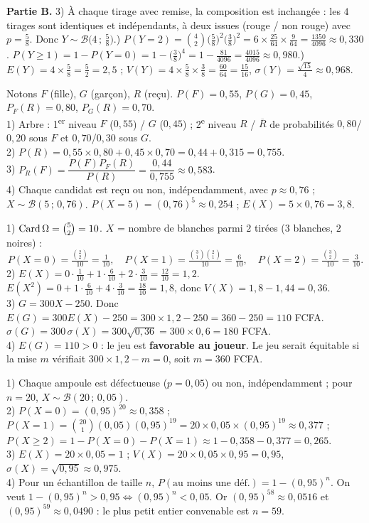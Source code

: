 \textbf{Partie B.} 3) À chaque tirage avec remise, la composition est inchangée :
les $4$ tirages sont identiques et indépendants, à deux issues (rouge / non
rouge) avec $p=\frac58$. Donc $Y\sim\mathcal B\big(4\,;\,\frac58\big)$.) $P(Y{=}2)=\binom42\Big(\frac58\Big)^2\Big(\frac38\Big)^2
=6\times\frac{25}{64}\times\frac{9}{64}=\frac{1350}{4096}\approx0{,}330$.
$P(Y\ge1)=1-P(Y{=}0)=1-\Big(\frac38\Big)^4=1-\frac{81}{4096}=\frac{4015}{4096}\approx0{,}980$.) $E(Y)=4\times\frac58=\frac52=2{,}5$ ;
$V(Y)=4\times\frac58\times\frac38=\frac{60}{64}=\frac{15}{16}$,
$\sigma(Y)=\frac{\sqrt{15}}{4}\approx0{,}968$.

Notons $F$ (fille), $G$ (garçon), $R$ (reçu). $P(F)=0{,}55$, $P(G)=0{,}45$,
$P_F(R)=0{,}80$, $P_G(R)=0{,}70$.\\
1) Arbre : 1\textsuperscript{er} niveau $F$ ($0{,}55$) / $G$ ($0{,}45$) ;
2\textsuperscript{e} niveau $R$ / $\overline R$ de probabilités $0{,}80$/$0{,}20$
sous $F$ et $0{,}70$/$0{,}30$ sous $G$.\\
2) $P(R)=0{,}55\times0{,}80+0{,}45\times0{,}70=0{,}44+0{,}315=0{,}755$.\\
3) $P_R(F)=\dfrac{P(F)P_F(R)}{P(R)}=\dfrac{0{,}44}{0{,}755}\approx0{,}583$.\\
4) Chaque candidat est reçu ou non, indépendamment, avec $p\approx0{,}76$ ;
$X\sim\mathcal B(5\,;\,0{,}76)$. $P(X{=}5)=(0{,}76)^5\approx0{,}254$ ;
$E(X)=5\times0{,}76=3{,}8$.

1) $\operatorname{Card}\Omega=\binom52=10$. $X$ = nombre de blanches parmi $2$ tirées ($3$
blanches, $2$ noires) :
\[
P(X{=}0)=\tfrac{\binom22}{10}=\tfrac1{10},\quad
P(X{=}1)=\tfrac{\binom31\binom21}{10}=\tfrac{6}{10},\quad
P(X{=}2)=\tfrac{\binom32}{10}=\tfrac{3}{10}.
\]
2) $E(X)=0\cdot\frac1{10}+1\cdot\frac6{10}+2\cdot\frac3{10}=\frac{12}{10}=1{,}2$.
$E(X^2)=0+1\cdot\frac6{10}+4\cdot\frac3{10}=\frac{18}{10}=1{,}8$, donc
$V(X)=1{,}8-1{,}44=0{,}36$.\\
3) $G=300X-250$. Donc $E(G)=300E(X)-250=300\times1{,}2-250=360-250=110$ FCFA.
$\sigma(G)=300\,\sigma(X)=300\sqrt{0{,}36}=300\times0{,}6=180$ FCFA.\\
4) $E(G)=110>0$ : le jeu est \textbf{favorable au joueur}. Le jeu serait équitable
si la mise $m$ vérifiait $300\times1{,}2-m=0$, soit $m=360$ FCFA.

1) Chaque ampoule est défectueuse ($p=0{,}05$) ou non, indépendamment ; pour
$n=20$, $X\sim\mathcal B(20\,;\,0{,}05)$.\\
2) $P(X{=}0)=(0{,}95)^{20}\approx0{,}358$ ;
$P(X{=}1)=\binom{20}{1}(0{,}05)(0{,}95)^{19}=20\times0{,}05\times(0{,}95)^{19}\approx0{,}377$ ;
$P(X\ge2)=1-P(X{=}0)-P(X{=}1)\approx1-0{,}358-0{,}377=0{,}265$.\\
3) $E(X)=20\times0{,}05=1$ ; $V(X)=20\times0{,}05\times0{,}95=0{,}95$,
$\sigma(X)=\sqrt{0{,}95}\approx0{,}975$.\\
4) Pour un échantillon de taille $n$, $P(\text{au moins une déf.})=1-(0{,}95)^n$.
On veut $1-(0{,}95)^n>0{,}95 \iff (0{,}95)^n<0{,}05$. Or $(0{,}95)^{58}\approx0{,}0516$
et $(0{,}95)^{59}\approx0{,}0490$ : le plus petit entier convenable est $n=59$.
